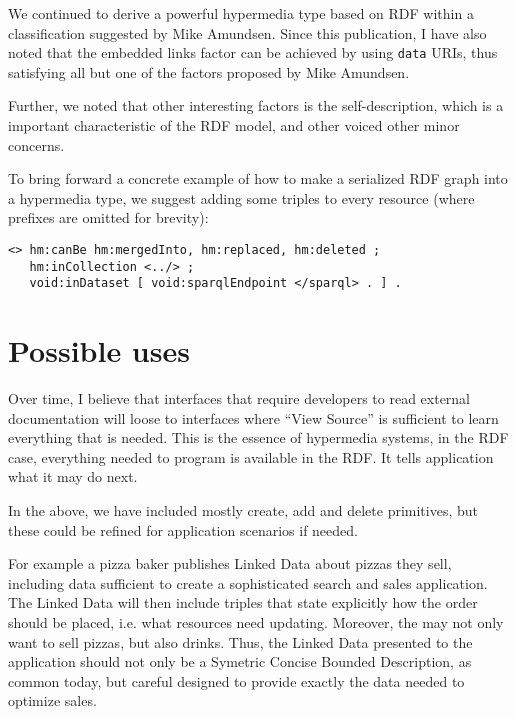 \documentclass{article}
\begin{document}
We continued to derive a powerful hypermedia type based on RDF within
a classification suggested by Mike Amundsen. Since this publication, I
have also noted that the embedded links factor can be achieved by
using \texttt{data} URIs, thus satisfying all but one of the factors
proposed by Mike Amundsen.

Further, we noted that other interesting factors is the
self-description, which is a important characteristic of the RDF
model, and other voiced other minor concerns.

To bring forward a concrete example of how to make a serialized RDF
graph into a hypermedia type, we suggest adding some triples to every
resource (where prefixes are omitted for brevity):

\begin{verbatim}
<> hm:canBe hm:mergedInto, hm:replaced, hm:deleted ;
   hm:inCollection <../> ;
   void:inDataset [ void:sparqlEndpoint </sparql> . ] .
\end{verbatim}

\section{Possible uses}

Over time, I believe that interfaces that require developers to read
external documentation will loose to interfaces where ``View Source''
is sufficient to learn everything that is needed. This is the essence
of hypermedia systems, in the RDF case, everything needed to program
is available in the RDF. It tells application what it may do next.

In the above, we have included mostly create, add and delete
primitives, but these could be refined for application scenarios if
needed.

For example a pizza baker publishes Linked Data about pizzas they
sell, including data sufficient to create a sophisticated search and
sales application. The Linked Data will then include triples that
state explicitly how the order should be placed, i.e. what resources
need updating. Moreover, the may not only want to sell pizzas, but
also drinks. Thus, the Linked Data presented to the application should
not only be a Symetric Concise Bounded Description, as common today,
but careful designed to provide exactly the data needed to optimize
sales.


%
%

\end{document}
